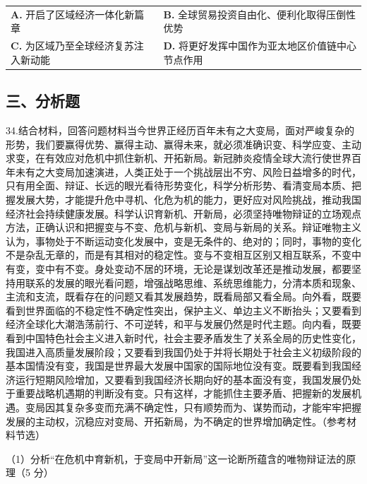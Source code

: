 \documentclass[UTF8,11pt]{ctexart}
\begin{document}
\begin{center}\begin{tabular}{>{\raggedright\arraybackslash}p{\dimexpr(\linewidth-4\tabcolsep)/2\relax}>{\raggedright\arraybackslash}p{\dimexpr(\linewidth-4\tabcolsep)/2\relax}}
\textbf{A.} 开启了区域经济一体化新篇章 & \textbf{B.} 全球贸易投资自由化、便利化取得压倒性优势\\[.35em]
\textbf{C.} 为区域乃至全球经济复苏注入新动能 & \textbf{D.} 将更好发挥中国作为亚太地区价值链中心节点作用\\[.35em]\end{tabular}\end{center}

\subsection*{三、分析题}

34.结合材料，回答问题材料当今世界正经历百年未有之大变局，面对严峻复杂的形势，我们要赢得优势、赢得主动、赢得未来，就必须准确识变、科学应变、主动求变，在有效应对危机中抓住新机、开拓新局。新冠肺炎疫情全球大流行使世界百年未有之大变局加速演进，人类正处于一个挑战层出不穷、风险日益增多的时代，只有用全面、辩证、长远的眼光看待形势变化，科学分析形势、看清变局本质、把握发展大势，才能提升危中寻机、化危为机的能力，更好应对风险挑战，推动我国经济社会持续健康发展。科学认识育新机、开新局，必须坚持唯物辩证的立场观点方法，正确认识和把握变与不变、危机与新机、变局与新局的关系。辩证唯物主义认为，事物处于不断运动变化发展中，变是无条件的、绝对的；同时，事物的变化不是杂乱无章的，而是有其相对的稳定性。变与不变相互区别又相互联系，不变中有变，变中有不变。身处变动不居的环境，无论是谋划改革还是推动发展，都要坚持用联系的发展的眼光看问题，增强战略思维、系统思维能力，分清本质和现象、主流和支流，既看存在的问题又看其发展趋势，既看局部又看全局。向外看，既要看到世界面临的不稳定性不确定性突出，保护主义、单边主义不断抬头；又要看到经济全球化大潮浩荡前行、不可逆转，和平与发展仍然是时代主题。向内看，既要看到中国特色社会主义进入新时代，社会主要矛盾发生了关系全局的历史性变化，我国进入高质量发展阶段；又要看到我国仍处于并将长期处于社会主义初级阶段的基本国情没有变，我国是世界最大发展中国家的国际地位没有变。既要看到我国经济运行短期风险增加，又要看到我国经济长期向好的基本面没有变，我国发展仍处于重要战略机遇期的判断没有变。只有这样，才能抓住主要矛盾、把握新的发展机遇。变局因其复杂多变而充满不确定性，只有顺势而为、谋势而动，才能牢牢把握发展的主动权，沉稳应对变局、开拓新局，为不确定的世界增加确定性。（参考材料节选）


（1）分析“在危机中育新机，于变局中开新局”这一论断所蕴含的唯物辩证法的原理（5 分）
\end{document}
